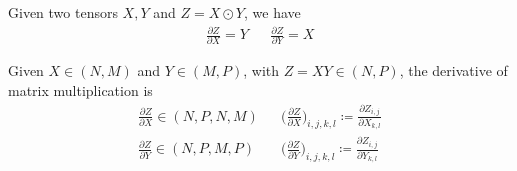   \begin{lemma}
    \label{thm:derivative-of-element-wise-multiplication}
    Given two tensors $X, Y$ and $Z = X \odot Y$, we have 
    \begin{align}
      \frac{\partial Z}{\partial X} = Y && \frac{\partial Z}{\partial Y} = X
    \end{align}
  \end{lemma} 

  \begin{lemma}
    \label{thm:derivative-of-matrix-multiplication}
    Given $X \in (N, M)$ and $Y \in (M, P)$, with $Z = XY \in (N, P)$, the derivative of matrix multiplication is 
    \begin{align}
      \frac{\partial Z}{\partial X} \in (N, P, N, M) && \bigg( \frac{\partial Z}{\partial X} \bigg)_{i, j, k, l} \coloneqq \frac{\partial Z_{i, j}}{\partial X_{k, l}} \\
      \frac{\partial Z}{\partial Y} \in (N, P, M, P) && \bigg( \frac{\partial Z}{\partial Y} \bigg)_{i, j, k, l} \coloneqq \frac{\partial Z_{i, j}}{\partial Y_{k, l}} 
    \end{align} 
  \end{lemma} 

